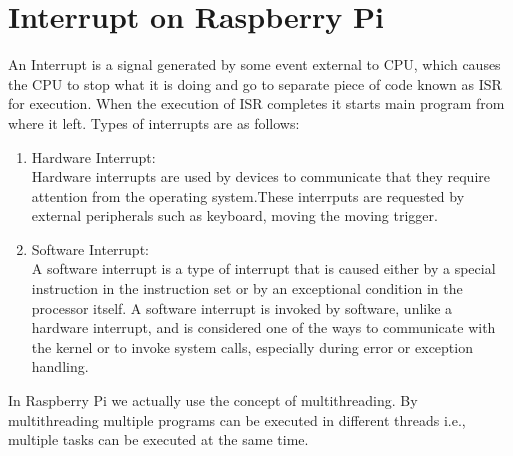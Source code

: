 \documentclass[a4paper,12pt,oneside]{book}
\begin{document}
\section{Interrupt on Raspberry Pi}
An Interrupt is a signal generated by some event external to CPU, which causes the CPU to stop what it is doing and go to separate piece of code known as ISR for execution. When the execution of ISR completes it starts main program from where it left.
Types of interrupts are as follows:
\begin{enumerate}
    \item Hardware Interrupt: \\
    Hardware interrupts are used by devices to communicate that they require attention from the operating system.These interrputs are requested by external peripherals such as keyboard, moving the moving trigger.
    \item Software Interrupt: \\
    A software interrupt is a type of interrupt that is caused either by a special instruction in the instruction set or by an exceptional condition in the processor itself. A software interrupt is invoked by software, unlike a hardware interrupt, and is considered one of the ways to communicate with the kernel or to invoke system calls, especially during error or exception handling.
\end{enumerate}
In Raspberry Pi we actually use the concept of multithreading. By multithreading multiple programs can be executed in different threads i.e., multiple tasks can be executed at the same time.\\
\newpage
\end{document}
